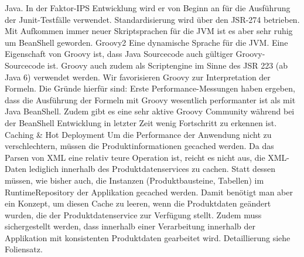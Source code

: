 \documentclass[headsepline=true, footsepline=true]{scrartcl}
\begin{document}
Java. In der Faktor-IPS Entwicklung wird er von Beginn an für die Ausführung der
Junit-Testfälle verwendet. Standardisierung wird über den JSR-274 betrieben. Mit
Aufkommen immer neuer Skriptsprachen für die JVM ist es aber sehr ruhig um
BeanShell geworden. Groovy2 Eine dynamische Sprache für die JVM. Eine Eigenschaft
von Groovy ist, dass Java Sourcecode auch gültiger Groovy-Sourcecode ist. Groovy
auch zudem als Scriptengine im Sinne des JSR 223 (ab Java 6) verwendet werden.
Wir favorisieren Groovy zur Interpretation der Formeln. Die Gründe hierfür sind:
Erste Performance-Messungen haben ergeben, dass die Ausführung der Formeln mit
Groovy wesentlich performanter ist als mit Java BeanShell. Zudem gibt es eine
sehr aktive Groovy Community während bei der BeanShell Entwicklung in letzter
Zeit wenig Fortschritt zu erkennen ist. Caching \& Hot Deployment Um die
Performance der Anwendung nicht zu verschlechtern, müssen die
Produktinformationen gecached werden. Da das Parsen von XML eine relativ teure
Operation ist, reicht es nicht aus, die XML-Daten lediglich innerhalb des
Produktdatenservices zu cachen. Statt dessen müssen, wie bisher auch, die
Instanzen (Produktbausteine, Tabellen) im RuntimeRepository der Applikation
gecached werden. Damit benötigt man aber ein Konzept, um diesen Cache zu leeren,
wenn die Produktdaten geändert wurden, die der Produktdatenservice zur Verfügung
stellt. Zudem muss sichergestellt werden, dass innerhalb einer Verarbeitung
innerhalb der Applikation mit konsistenten Produktdaten gearbeitet wird.
Detaillierung siehe Foliensatz.
\end{document}
